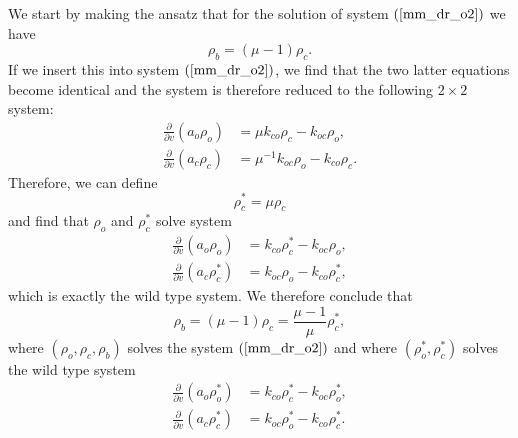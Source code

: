 We start by making the ansatz that for the solution of system $\left(  \ref{mm_dr_o2}\right)$ we have
\begin{equation}
\rho_{b}=\left(  \mu-1\right)  \rho_{c}. \label{mot_ans}%
\end{equation}
If we insert this into system $\left(  \ref{mm_dr_o2}\right)$, we find that
the two latter equations become identical and the system is therefore reduced to the following $2\times 2$
system:
\begin{align}
\frac{\partial}{\partial v}\left(  a_{o}\rho_{o}\right)   &  =\mu k_{co}%
\rho_{c}-k_{oc}\rho_{o},\nonumber\\
\frac{\partial}{\partial v}\left(  a_{c}\rho_{c}\right)   &  =\mu^{-1}%
k_{oc}\rho_{o}-k_{co}\rho_{c}.
\end{align}
Therefore, we can define
\[
\rho_{c}^{\ast}=\mu\rho_{c}%
\]
and find that $\rho_{o}$ and $\rho_{c}^{\ast}$ solve system%
\begin{align}
\frac{\partial}{\partial v}\left(  a_{o}\rho_{o}\right)   &  = k_{co}%
\rho_{c}^{\ast}-k_{oc}\rho_{o},\nonumber\\
\frac{\partial}{\partial v}\left(  a_{c}\rho_{c}^{\ast}\right)   &
=k_{oc}\rho_{o}-k_{co}\rho_{c}^{\ast},
\end{align}
which is exactly the wild type system. We therefore conclude that 
\begin{equation}
\rho_{b}=\left(  \mu-1\right)  \rho_{c}=\frac{\mu-1}{\mu}  \rho^*_{c}, \label{rb}
\end{equation}
where $(\rho_{o},\rho_{c},\rho_{b})$ solves the system $\left(  \ref{mm_dr_o2}\right)$
and where $(\rho^*_{o},\rho^*_{c})$ solves the wild type system
\begin{align*}
\frac{\partial}{\partial v}\left(  a_{o}\rho^*_{o}\right)   &  =k_{co}\rho^*_{c}-k_{oc}\rho^*_{o},\\
\frac{\partial}{\partial v}\left(  a_{c}\rho^*_{c}\right)   &  =k_{oc}%
\rho^*_{o}-k_{co}\rho^*_{c}.
\end{align*}




